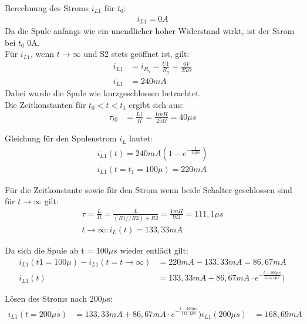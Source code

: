 \documentclass{article}
\begin{document}
Berechnung des Stroms $i_{L1}$ für $t_0$:
\begin{align*}
  i_{L1} = 0A
\end{align*}
Da die Spule anfangs wie ein unendlicher hoher Widerstand wirkt, ist der Strom bei $t_0$ 0A.\\


Für $i_{L1}$, wenn $t \rightarrow \infty$ und S2 stets geöffnet ist, gilt:
\begin{align*}
  i_{L1}&= i_{R_g} = \frac{U1}{R_g} = \frac{6V}{25\Omega}\\
  i_{L1}&= 240mA
\end{align*}
Dabei wurde die Spule wie kurzgeschlossen betrachtet. \\

Die Zeitkonstanten für $t_0 < t < t_1$ ergibt sich aus:
\begin{align*}
  \tau_{t0} &= \frac{L1}{R} = \frac{1mH}{25\Omega}=40\mu s
\end{align*}

Gleichung für den Spulenstrom $i_L$ lautet:
\begin{align*}
  i_{L1}(t) = 240mA (1 - e^{-\frac{t}{40\mu s}})\\
  i_{L1}(t=t_1=100\mu) = 220mA
\end{align*}

Für die Zeitkonstante sowie für den Strom wenn beide Schalter geschlossen sind für $t \rightarrow \infty$ gilt:
\begin{align*}
  \tau = \frac{L}{R} = \frac{L}{(R1//R3)+R2} = \frac{1mH}{9\Omega} = 111,1\mu s\\
  t\rightarrow\infty : i_L(t) = 133,33mA
\end{align*}

Da sich die Spule ab t = $100\mu s$ wieder entlädt gilt:
\begin{align*}
  i_{L1}(t1=100\mu) - i_{L1}(t=t\rightarrow \infty) &= 220mA - 133,33mA = 86,67mA\\
  i_{L1}(t) &= 133,33mA + 86,67mA\cdot e^{-\frac{t-100\mu s}{111,1\mu s}})
\end{align*}


Lösen des Stroms nach $200\mu$s:
\begin{align*}
  i_{L1}(t=200\mu s) &= 133,33mA + 86,67mA\cdot e^{-\frac{t-100\mu s}{111,1\mu s}})
  i_{L1}(200\mu s) &= 168,69mA
\end{align*}
\end{document}
